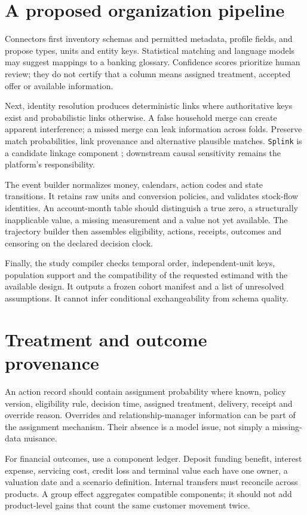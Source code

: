 \section{A proposed organization pipeline}
Connectors first inventory schemas and permitted metadata, profile fields,
and propose types, units and entity keys. Statistical matching and language
models may suggest mappings to a banking glossary. Confidence scores
prioritize human review; they do not certify that a column means assigned
treatment, accepted offer or available information.

Next, identity resolution produces deterministic links where authoritative
keys exist and probabilistic links otherwise. A false household merge can
create apparent interference; a missed merge can leak information across
folds. Preserve match probabilities, link provenance and alternative plausible
matches. \texttt{Splink} is a candidate linkage component
\citep{sw_splink}; downstream causal sensitivity remains the platform's
responsibility.

The event builder normalizes money, calendars, action codes and state
transitions. It retains raw units and conversion policies, and validates
stock-flow identities. An account-month table should distinguish a true
zero, a structurally inapplicable value, a missing measurement and a value
not yet available. The trajectory builder then assembles eligibility,
actions, receipts, outcomes and censoring on the declared decision clock.

Finally, the study compiler checks temporal order, independent-unit keys,
population support and the compatibility of the requested estimand with the
available design. It outputs a frozen cohort manifest and a list of
unresolved assumptions. It cannot infer conditional exchangeability from
schema quality.

\section{Treatment and outcome provenance}
An action record should contain assignment probability where known, policy
version, eligibility rule, decision time, assigned treatment, delivery,
receipt and override reason. Overrides and relationship-manager information
can be part of the assignment mechanism. Their absence is a model issue,
not simply a missing-data nuisance.

For financial outcomes, use a component ledger. Deposit funding benefit,
interest expense, servicing cost, credit loss and terminal value each have
one owner, a valuation date and a scenario definition. Internal transfers
must reconcile across products. A group effect aggregates compatible
components; it should not add product-level gains that count the same
customer movement twice.

